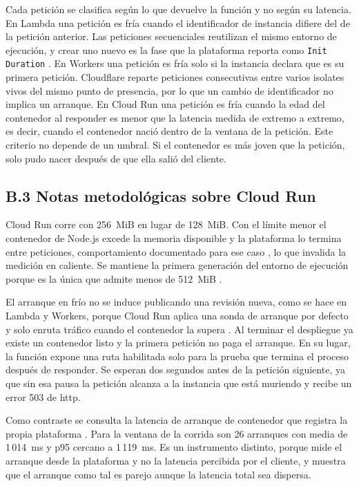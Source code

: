 \documentclass[12pt, letterpaper, table, xcdraw]{inf-pucv}
\begin{document}
Cada petición se clasifica según lo que devuelve la función y no según su latencia.
En Lambda una petición es fría cuando el identificador de instancia difiere del de la
petición anterior. Las peticiones secuenciales reutilizan el mismo entorno de ejecución,
y crear uno nuevo es la fase que la plataforma reporta como \texttt{Init Duration}
\parencite{awsLambdaLifecycle}. En Workers una petición es fría solo si la instancia
declara que es su primera petición. Cloudflare reparte peticiones consecutivas entre
varios isolates vivos del mismo punto de presencia, por lo que un cambio de
identificador no implica un arranque. En Cloud Run una petición es fría cuando la edad
del contenedor al responder es menor que la latencia medida de extremo a extremo, es
decir, cuando el contenedor nació dentro de la ventana de la petición. Este criterio no
depende de un umbral. Si el contenedor es más joven que la petición, solo pudo nacer
después de que ella salió del cliente.

\subsection*{B.3 Notas metodológicas sobre Cloud Run}

Cloud Run corre con 256~MiB en lugar de 128~MiB. Con el límite menor el contenedor de
Node.js excede la memoria disponible y la plataforma lo termina entre peticiones,
comportamiento documentado para ese caso \parencite{gcp2026runmemory}, lo que invalida
la medición en caliente. Se mantiene la primera generación del entorno de ejecución
porque es la única que admite menos de 512~MiB \parencite{gcprunenv}.

El arranque en frío no se induce publicando una revisión nueva, como se hace en Lambda
y Workers, porque Cloud Run aplica una sonda de arranque por defecto y solo enruta
tráfico cuando el contenedor la supera \parencite{gcrHealthchecks}. Al terminar el
despliegue ya existe un contenedor listo y la primera petición no paga el arranque. En
su lugar, la función expone una ruta habilitada solo para la prueba que termina el
proceso después de responder. Se esperan dos segundos antes de la petición siguiente,
ya que sin esa pausa la petición alcanza a la instancia que está muriendo y recibe un
error 503 de http.

Como contraste se consulta la latencia de arranque de contenedor que registra la propia
plataforma \parencite{gcpMetricsRun}. Para la ventana de la corrida son 26 arranques
con media de 1\,014~ms y p95 cercano a 1\,119~ms. Es un instrumento distinto, porque mide
el arranque desde la plataforma y no la latencia percibida por el cliente, y muestra
que el arranque como tal es parejo aunque la latencia total sea dispersa.
\end{document}
